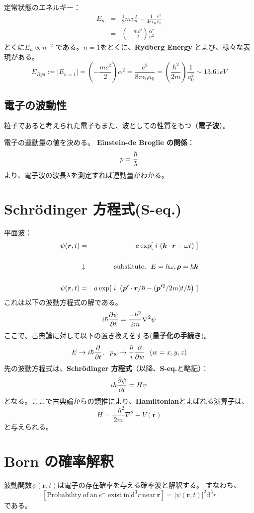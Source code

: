 定常状態のエネルギー：
\begin{eqnarray*}
	E_n &=& \frac{1}{2}mv_n^2 - \frac{1}{4\pi\epsilon_0} \frac{e^2}{r_n} \\
	&=& \left( -\frac{mc^2}{2} \right) \frac{\alpha^2}{n^2}
\end{eqnarray*}
とくに$E_n \propto n^{-2}$ である。$n=1$をとくに、\textbf{Rydberg Energy} とよび、様々な表現がある。
\[
	E_{Ryd} := |E_{n=1}| = \left( -\frac{mc^2}{2} \right) \alpha^2
	= \frac{e^2}{8\pi\epsilon_0 a_0}
	= \left( \frac{\hbar^2}{2m} \right) \frac{1}{a_0^2}
	\sim 13.61 eV
\]

\subsection{電子の波動性}
粒子であると考えられた電子もまた、波としての性質をもつ（\textbf{電子波}）。

電子の運動量の値を決める。 \textbf{Einstein-de Broglie の関係}：
\[
	p = \frac{\hbar}{\lambdabar}
\]
より、電子波の波長$\lambdabar$を測定すれば運動量がわかる。
\\

\section{Schr\"odinger 方程式(S-eq.)}
平面波：
\begin{eqnarray*}
	\psi(\bm{r},t) &=& a \exp [\ i\ (\bm{k} \cdot \bm{r} - \omega t)\ ] \\ \\
	&\downarrow & \mathrm{substitute.}\ \  E=\hbar \omega, \bm{p}=\hbar\bm{k} \\ \\
	\psi(\bm{r},t) &=& a \exp [\ i\ \left( \bm{p'} \cdot \bm{r}/\hbar - (\bm{p'}^2/2m) t/\hbar \right) \ ]
\end{eqnarray*}
これは以下の波動方程式の解である。
\[
	i\hbar \frac{\partial \psi}{\partial t} = \frac{-\hbar^2}{2m} \nabla^2 \psi
\]
ここで、古典論に対して以下の置き換えをする(\textbf{量子化の手続き})。
\[
	E \rightarrow i\hbar \partialder{}{t}, \ \ p_w \rightarrow \frac{\hbar}{i} \partialder{}{w}\ \ (w = x, y, z)
\]
先の波動方程式は、\textbf{Schr\"odinger 方程式}（以降、\textbf{S-eq.}と略記）： 
\[
	i\hbar \frac{\partial \psi}{\partial t} = H\psi
\]
となる。ここで古典論からの類推により、\textbf{Hamiltonian}とよばれる演算子は、
\[
	H = \frac{-\hbar^2}{2m} \nabla^2 +V(\bm{r})
\]
と与えられる。

\section{Born の確率解釈}
波動関数$\psi(\bm{r},t)$は電子の存在確率を与える確率波と解釈する。
すなわち、
\[
	[
	\mathrm{Probability\ of\ an\ }e^-\ \mathrm{exist\ in\ }\mathrm{d}^3 r\ \mathrm{near\ } \bm{r}]
	= |\psi(\bm{r},t)|^2 \mathrm{d}^3 r
\]
である。

